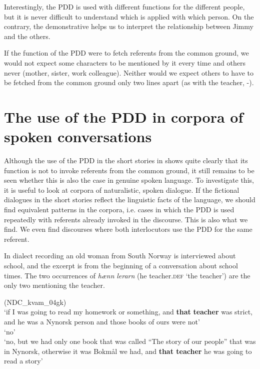 \documentclass[output=paper,colorlinks,citecolor=brown]{langscibook}
\begin{document}
Interestingly, the PDD is used with different functions for the different people, but it is never difficult to understand which is applied with which person. On the contrary, the demonstrative helps us to interpret the relationship between Jimmy and the others. 

If the function of the PDD were to fetch referents from the common ground, we would not expect some characters to be mentioned by it every time and others never (mother, sister, work colleague). Neither would we expect others to have to be fetched from the common ground only two lines apart (as with the teacher, -). 

\section{The use of the PDD in corpora of spoken conversations}\label{sec:johannessen:5}

Although the use of the PDD in the short stories in  shows quite clearly that its function is not to invoke referents from the common ground, it still remains to be seen whether this is also the case in genuine spoken language. To investigate this, it is useful to look at corpora of naturalistic, spoken dialogue. If the fictional dialogues in the short stories reflect the linguistic facts of the language, we should find equivalent patterns in the corpora, i.e. cases in which the PDD is used repeatedly with referents already invoked in the discourse. This is also what we find. We even find discourses where both interlocutors use the PDD for the same referent.

In dialect recording  an old woman from South Norway is interviewed about school, and the excerpt is from the beginning of a conversation about school times. The two occurrences of \textit{hænn} \textit{lerarn} (he teacher.\textsc{def} \textsc{‘}the teacher’) are the only two mentioning the teacher. 

\ea\label{ex:johannessen:30} {(NDC\_kvam\_04gk)}
\\
\glt ‘if I was going to read my homework or something, and \textbf{that} \textbf{teacher} was strict, and he was a Nynorsk person and those books of ours were not’
\\
\glt ‘no’
\\
\glt ‘no, but we had only one book that was called “The story of our people” that was in Nynorsk, otherwise it was Bokmål we had, and \textbf{that teacher} he was going to read a story’\footnotemark{}
\z
\z
{}
\end{document}
